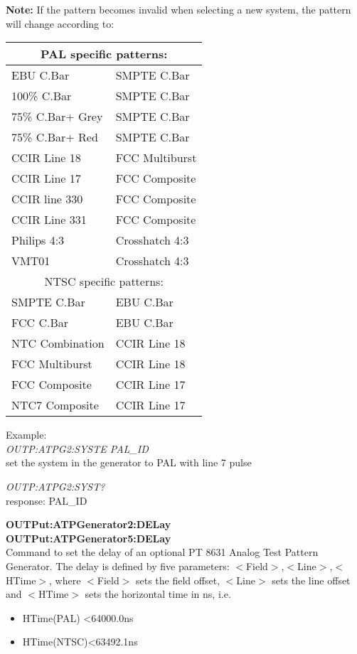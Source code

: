 \textbf{Note:} If the pattern becomes invalid when selecting a new system, the pattern will change according to:

\begin{tabular}{|l @{ $\rightarrow$ } l|}
\hline
\multicolumn{2}{|c|}{PAL specific patterns:} \\ \hline
EBU C.Bar & SMPTE C.Bar\\ \hline
100\% C.Bar & SMPTE C.Bar\\ \hline
75\% C.Bar+ Grey & SMPTE C.Bar\\ \hline
75\% C.Bar+ Red & SMPTE C.Bar\\ \hline
CCIR Line 18 & FCC Multiburst\\ \hline
CCIR Line 17 & FCC Composite\\ \hline
CCIR line 330 & FCC Composite\\ \hline
CCIR Line 331 & FCC Composite\\ \hline
Philips 4:3 & Crosshatch 4:3\\ \hline
VMT01 & Crosshatch 4:3\\ \hline
\multicolumn{2}{|c|}{NTSC specific patterns:} \\ \hline
SMPTE C.Bar & EBU C.Bar\\ \hline
FCC C.Bar & EBU C.Bar\\ \hline
NTC Combination & CCIR Line 18\\ \hline
FCC Multiburst & CCIR Line 18\\ \hline
FCC Composite & CCIR Line 17\\ \hline
NTC7 Composite & CCIR Line 17\\ \hline
\end{tabular}

Example:\\
\textit{OUTP:ATPG2:SYSTE PAL\_ID}\\
set the system in the generator to PAL with line 7 pulse

\textit{OUTP:ATPG2:SYST?}\\
response: PAL\_ID

\textbf{OUTPut:ATPGenerator2:DELay}\\
\textbf{OUTPut:ATPGenerator5:DELay}\\
Command to set the delay of an optional PT 8631 Analog Test Pattern Generator. The delay is defined by five parameters: $<$Field$>$,$<$Line$>$,$<$HTime$>$, where $<$Field$>$ sets the field offset, $<$Line$>$ sets the line offset and $<$HTime$>$ sets the horizontal time in ns, i.e.

\begin{itemize}
\item HTime(PAL) <64000.0ns
\item HTime(NTSC)<63492.1ns
\end{itemize}

